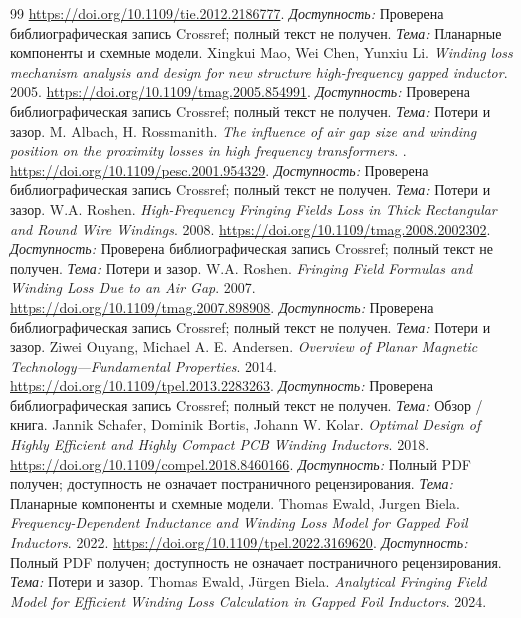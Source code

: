 \documentclass[14pt,a4paper]{extarticle}
\begin{document}
\begin{thebibliography}{99}
\url{https://doi.org/10.1109/tie.2012.2186777}.
\textit{Доступность:} Проверена библиографическая запись Crossref; полный текст не получен. \textit{Тема:} Планарные компоненты и схемные модели.
Xingkui Mao, Wei Chen, Yunxiu Li. \textit{Winding loss mechanism analysis and design for new structure high-frequency gapped inductor}. 2005.
\url{https://doi.org/10.1109/tmag.2005.854991}.
\textit{Доступность:} Проверена библиографическая запись Crossref; полный текст не получен. \textit{Тема:} Потери и зазор.
M. Albach, H. Rossmanith. \textit{The influence of air gap size and winding position on the proximity losses in high frequency transformers}. .
\url{https://doi.org/10.1109/pesc.2001.954329}.
\textit{Доступность:} Проверена библиографическая запись Crossref; полный текст не получен. \textit{Тема:} Потери и зазор.
W.A. Roshen. \textit{High-Frequency Fringing Fields Loss in Thick Rectangular and Round Wire Windings}. 2008.
\url{https://doi.org/10.1109/tmag.2008.2002302}.
\textit{Доступность:} Проверена библиографическая запись Crossref; полный текст не получен. \textit{Тема:} Потери и зазор.
W.A. Roshen. \textit{Fringing Field Formulas and Winding Loss Due to an Air Gap}. 2007.
\url{https://doi.org/10.1109/tmag.2007.898908}.
\textit{Доступность:} Проверена библиографическая запись Crossref; полный текст не получен. \textit{Тема:} Потери и зазор.
Ziwei Ouyang, Michael A. E. Andersen. \textit{Overview of Planar Magnetic Technology—Fundamental Properties}. 2014.
\url{https://doi.org/10.1109/tpel.2013.2283263}.
\textit{Доступность:} Проверена библиографическая запись Crossref; полный текст не получен. \textit{Тема:} Обзор / книга.
Jannik Schafer, Dominik Bortis, Johann W. Kolar. \textit{Optimal Design of Highly Efficient and Highly Compact PCB Winding Inductors}. 2018.
\url{https://doi.org/10.1109/compel.2018.8460166}.
\textit{Доступность:} Полный PDF получен; доступность не означает постраничного рецензирования. \textit{Тема:} Планарные компоненты и схемные модели.
Thomas Ewald, Jurgen Biela. \textit{Frequency-Dependent Inductance and Winding Loss Model for Gapped Foil Inductors}. 2022.
\url{https://doi.org/10.1109/tpel.2022.3169620}.
\textit{Доступность:} Полный PDF получен; доступность не означает постраничного рецензирования. \textit{Тема:} Потери и зазор.
Thomas Ewald, Jürgen Biela. \textit{Analytical Fringing Field Model for Efficient Winding Loss Calculation in Gapped Foil Inductors}. 2024.

\end{thebibliography}
\end{document}
